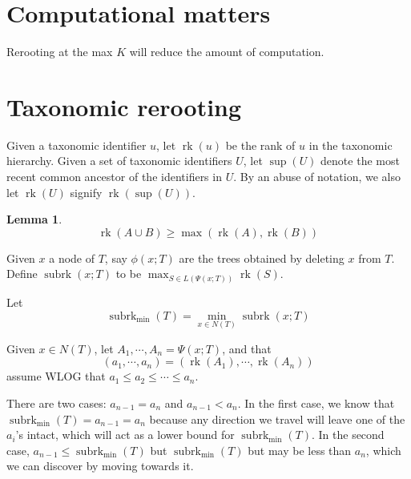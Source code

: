 \documentclass{amsart}
\newcommand{\treecut}{\Psi}
\newcommand{\rk}{\operatorname{rk}}
\newcommand{\subrk}{\operatorname{subrk}}
\newcommand{\minsubrk}{\subrk_{\min}}
\newcommand{\mrca}{\sup}
\newtheorem{lemma}{Lemma}
\begin{document}
\section{Computational matters}

Rerooting at the max $K$ will reduce the amount of computation.

\section{Taxonomic rerooting}

Given a taxonomic identifier $u$, let $\rk(u)$ be the rank of $u$ in the taxonomic hierarchy.
Given a set of taxonomic identifiers $U$, let $\mrca(U)$ denote the most recent common ancestor of the identifiers in $U$.
By an abuse of notation, we also let $\rk(U)$ signify $\rk(\mrca(U))$.

\begin{lemma}
  \[
  \rk(A \cup B) \geq \max(\rk(A),\rk(B))
  \]
\end{lemma}

Given $x$ a node of $T$, say $\phi(x;T)$ are the trees obtained by deleting $x$ from $T$.
Define $\subrk(x;T)$ to be $\max_{S \in L(\treecut(x;T))} \rk(S)$.

Let
\[
\minsubrk(T) = \min_{x \in N(T)} \subrk(x;T)
\]

Given $x \in N(T)$, let ${A_1,\cdots,A_n} = \treecut(x;T)$, and that
\[
  (a_1,\cdots,a_n) = (\rk(A_1), \cdots, \rk(A_n))
\]
assume WLOG that $a_1 \leq a_2 \leq \cdots \leq a_n$.

There are two cases: $a_{n-1} = a_n$ and $a_{n-1} < a_n$.
In the first case, we know that $\minsubrk(T) = a_{n-1} = a_n$ because any direction we travel will leave one of the $a_i$'s intact, which will act as a lower bound for $\minsubrk(T)$.
In the second case, $a_{n-1} \leq \minsubrk(T)$ but $\minsubrk(T)$ but may be less than $a_n$, which we can discover by moving towards it.
\end{document}
